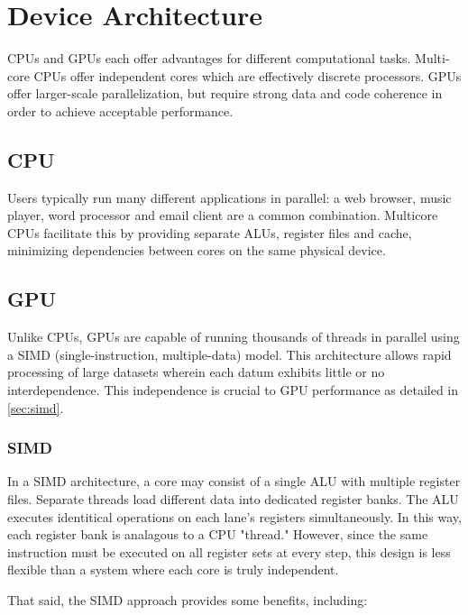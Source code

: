 \chapter{Device Architecture} \label{ch:device architecture}

CPUs and GPUs each offer advantages for different computational tasks. Multi-core CPUs offer independent cores which are effectively discrete processors. GPUs offer larger-scale parallelization, but require strong data and code coherence in order to achieve acceptable performance.

\section{CPU}

Users typically run many different applications in parallel: a web browser, music player, word processor and email client are a common combination. Multicore CPUs facilitate this by providing separate ALUs, register files and cache, minimizing dependencies between cores on the same physical device. 

\section{GPU}

Unlike CPUs, GPUs are capable of running thousands of threads in parallel using a SIMD (single-instruction, multiple-data) model. This architecture allows rapid processing of large datasets wherein each datum exhibits little or no interdependence.  This independence is crucial to GPU performance as detailed in \autoref{sec:simd}.

\subsection{SIMD}\label{sec:simd}

In a SIMD\cite{Massingill:2007:SAP:1772070.1772078} architecture, a core may consist of a single ALU with multiple register files. Separate threads load different data into dedicated register banks. The ALU executes identitical operations on each lane's registers simultaneously. In this way, each register bank is analagous to a CPU "thread." However, since the same instruction must be executed on all register sets at every step, this design is less flexible than a system where each core is truly independent. 

That said, the SIMD approach provides some benefits, including:

